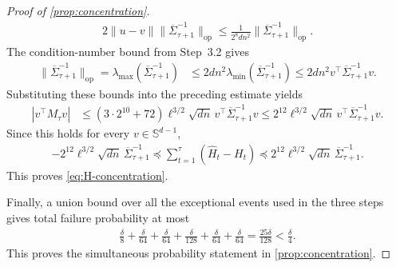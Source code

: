 \documentclass[11pt]{article}
\newcommand{\op}{\mathrm{op}}
\newcommand{\1}{\mathbf 1}
\begin{document}
\begin{proof}[Proof of \cref{prop:concentration}]
\begin{align}
        2\|u-v\|
        \|\overline\Sigma_{\tau+1}^{-1}\|_{\op}
        \leq
        \frac{1}{2^8dn^2}
        \|\overline\Sigma_{\tau+1}^{-1}\|_{\op}.
    \end{align}
    The condition-number bound from Step~3.2 gives
    \begin{align}
        \|\overline\Sigma_{\tau+1}^{-1}\|_{\op}
        =
        \lambda_{\max}
        \left(\overline\Sigma_{\tau+1}^{-1}\right)
         & \leq
        2dn^2
        \lambda_{\min}
        \left(\overline\Sigma_{\tau+1}^{-1}\right)
        \leq
        2dn^2
        v^\top\overline\Sigma_{\tau+1}^{-1}v.
    \end{align}
    Substituting these bounds into the preceding estimate yields
    \begin{align}
        |v^\top M_\tau v|
         & \leq
        \left(
        3\cdot2^{10}+72
        \right)
        \ell^{3/2}\sqrt{dn}\,
        v^\top\overline\Sigma_{\tau+1}^{-1}v
        \leq
        2^{12}\ell^{3/2}\sqrt{dn}\,
        v^\top\overline\Sigma_{\tau+1}^{-1}v.
    \end{align}
    Since this holds for every $v\in\mathbb S^{d-1}$,
    \begin{align}
        -2^{12}\ell^{3/2}\sqrt{dn}\,
        \overline\Sigma_{\tau+1}^{-1}
        \preceq
        \sum_{t=1}^{\tau}(\widehat H_t-H_t)
        \preceq
        2^{12}\ell^{3/2}\sqrt{dn}\,
        \overline\Sigma_{\tau+1}^{-1}.
    \end{align}
    This proves \eqref{eq:H-concentration}.

    Finally, a union bound over all the exceptional events used in the three
    steps gives total failure probability at most
    \begin{align}
        \frac{\delta}{8}
        +\frac{\delta}{64}
        +\frac{\delta}{64}
        +\frac{\delta}{128}
        +\frac{\delta}{64}
        +\frac{\delta}{64}
        =\frac{25\delta}{128}
        <\frac{\delta}{4}.
    \end{align}
    This proves the simultaneous probability statement in
    \cref{prop:concentration}.
\end{proof}

% 
\end{document}
